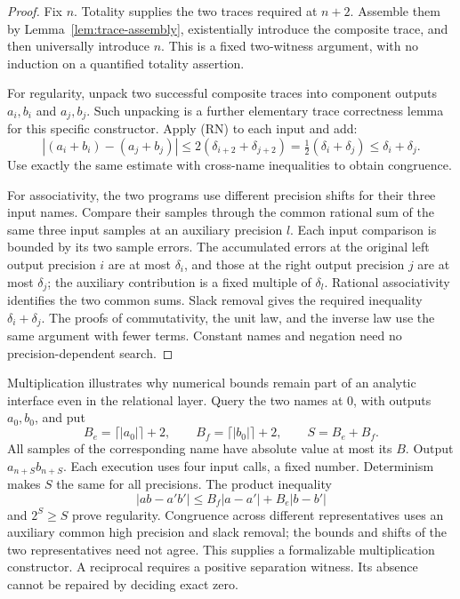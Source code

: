\begin{proof}
Fix $n$. Totality supplies the two traces required at $n+2$. Assemble them
by Lemma~\ref{lem:trace-assembly}, existentially introduce the composite
trace, and then universally introduce $n$. This is a fixed two-witness
argument, with no induction on a quantified totality assertion.

For regularity, unpack two successful composite traces into component
outputs $a_i,b_i$ and $a_j,b_j$. Such unpacking is a further elementary
trace correctness lemma for this specific constructor. Apply (RN) to each
input and add:
\[
 |(a_i+b_i)-(a_j+b_j)|
   \leq 2(\delta_{i+2}+\delta_{j+2})
   =\tfrac12(\delta_i+\delta_j)
   \leq\delta_i+\delta_j.
\]
Use exactly the same estimate with cross-name inequalities to obtain
congruence.

For associativity, the two programs use different precision shifts for
their three input names. Compare their samples through the common rational
sum of the same three input samples at an auxiliary precision $l$. Each
input comparison is bounded by its two sample errors. The accumulated
errors at the original left output precision $i$ are at most
$\delta_i$, and those at the right output precision $j$ are at most
$\delta_j$; the auxiliary contribution is a fixed multiple of $\delta_l$.
Rational associativity identifies the two common sums. Slack removal gives
the required inequality $\delta_i+\delta_j$. The proofs of commutativity,
the unit law, and the inverse law use the same argument with fewer terms.
Constant names and negation need no precision-dependent search.
\end{proof}

Multiplication illustrates why numerical bounds remain part of an analytic
interface even in the relational layer. Query the two names at $0$, with
outputs $a_0,b_0$, and put
\[
 B_e=\lceil |a_0|\rceil+2,\qquad
 B_f=\lceil |b_0|\rceil+2,\qquad S=B_e+B_f.
\]
All samples of the corresponding name have absolute value at most its $B$.
Output $a_{n+S}b_{n+S}$. Each execution uses four input calls, a fixed number.
Determinism makes $S$ the same for all precisions. The product inequality
\[
 |ab-a'b'|\leq B_f|a-a'|+B_e|b-b'|
\]
and $2^S\geq S$ prove regularity. Congruence across different representatives
uses an auxiliary common high precision and slack removal; the bounds and
shifts of the two representatives need not agree. This supplies a
formalizable multiplication constructor. A reciprocal requires a positive
separation witness. Its absence cannot be repaired by deciding exact zero.


